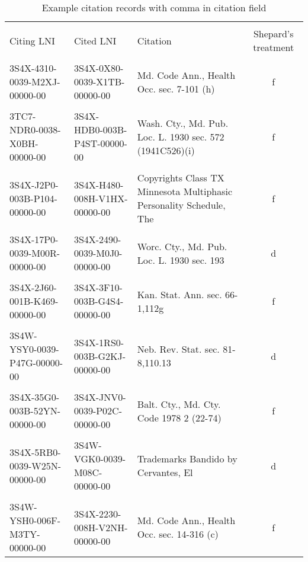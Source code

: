 \documentclass[10pt, letterpaper]{article}
\begin{document}
\begin{spacing}{1.0}
\begin{table}[H]
    \begin{adjustwidth}{-0.225in}{}
        \centering
        \caption{Example citation records with comma in citation field}
        \footnotesize
        \setlength\tabcolsep{2pt}
        \begin{tabular}{llp{2in}c}
            \hline\\[-6pt]
            Citing LNI & Cited LNI & Citation & Shepard's treatment\\[2pt]
            \hline\\[-6pt]
            3S4X-4310-0039-M2XJ-00000-00 & 3S4X-0X80-0039-X1TB-00000-00 & Md. Code Ann., Health Occ. sec. 7-101 (h) & f\\
            & & &\\[-6pt]
            3TC7-NDR0-0038-X0BH-00000-00 & 3S4X-HDB0-003B-P4ST-00000-00 & Wash. Cty., Md. Pub. Loc. L. 1930 sec. 572 (1941C526)(i) & f\\
            & & &\\[-6pt]
            3S4X-J2P0-003B-P104-00000-00 & 3S4X-H480-008H-V1HX-00000-00 & Copyrights Class TX Minnesota Multiphasic Personality Schedule, The & f\\
            & & &\\[-6pt]
            3S4X-17P0-0039-M00R-00000-00 & 3S4X-2490-0039-M0J0-00000-00 & Worc. Cty., Md. Pub. Loc. L. 1930 sec. 193 & d\\
            & & &\\[-6pt]
            3S4X-2J60-001B-K469-00000-00 & 3S4X-3F10-003B-G4S4-00000-00 & Kan. Stat. Ann. sec. 66-1,112g & f\\
            & & &\\[-6pt]
            3S4W-YSY0-0039-P47G-00000-00 & 3S4X-1RS0-003B-G2KJ-00000-00 & Neb. Rev. Stat. sec. 81-8,110.13 & d\\
            & & &\\[-6pt]
            3S4X-35G0-003B-52YN-00000-00 & 3S4X-JNV0-0039-P02C-00000-00 & Balt. Cty., Md. Cty. Code 1978 2 (22-74) & f\\
            & & &\\[-6pt]
            3S4X-5RB0-0039-W25N-00000-00 & 3S4W-VGK0-0039-M08C-00000-00 & Trademarks Bandido by Cervantes, El & d\\
            & & &\\[-6pt]
            3S4W-YSH0-006F-M3TY-00000-00 & 3S4X-2230-008H-V2NH-00000-00 & Md. Code Ann., Health Occ. sec. 14-316 (c) & f\\

\end{tabular}
\end{adjustwidth}
\end{table}
\end{spacing}
\end{document}
